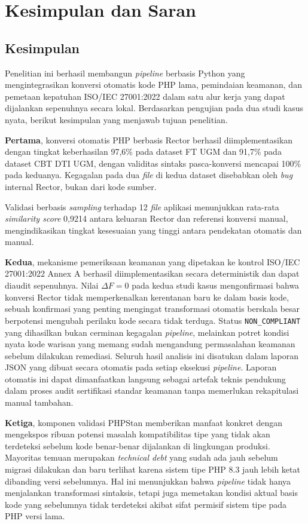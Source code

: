 \chapter{Kesimpulan dan Saran}

\section{Kesimpulan}

Penelitian ini berhasil membangun \textit{pipeline} berbasis Python 
yang mengintegrasikan konversi otomatis kode PHP lama, pemindaian 
keamanan, dan pemetaan kepatuhan ISO/IEC 27001:2022 dalam satu alur 
kerja yang dapat dijalankan sepenuhnya secara lokal. Berdasarkan 
pengujian pada dua studi kasus nyata, berikut kesimpulan yang 
menjawab tujuan penelitian.

\textbf{Pertama}, konversi otomatis PHP berbasis Rector berhasil 
diimplementasikan dengan tingkat keberhasilan 97,6\% pada dataset 
FT UGM dan 91,7\% pada dataset CBT DTI UGM, dengan validitas 
sintaks pasca-konversi mencapai 100\% pada keduanya. Kegagalan 
pada dua \textit{file} di kedua dataset disebabkan oleh 
\textit{bug} internal Rector, bukan dari kode sumber.

Validasi berbasis \textit{sampling} terhadap 12 \textit{file}
aplikasi menunjukkan rata-rata \textit{similarity score} 0,9214
antara keluaran Rector dan referensi konversi manual,
mengindikasikan tingkat kesesuaian yang tinggi antara
pendekatan otomatis dan manual.

\textbf{Kedua}, mekanisme pemeriksaan keamanan yang dipetakan ke
kontrol ISO/IEC 27001:2022 Annex A berhasil diimplementasikan secara
deterministik dan dapat diaudit sepenuhnya. Nilai $\Delta F = 0$ pada
kedua studi kasus mengonfirmasi bahwa konversi Rector tidak
memperkenalkan kerentanan baru ke dalam basis kode, sebuah konfirmasi
yang penting mengingat transformasi otomatis berskala besar berpotensi
mengubah perilaku kode secara tidak terduga. Status
\texttt{NON\_COMPLIANT} yang dihasilkan bukan cerminan kegagalan
\textit{pipeline}, melainkan potret kondisi nyata kode warisan yang
memang sudah mengandung permasalahan keamanan sebelum dilakukan
remediasi. Seluruh hasil analisis ini disatukan dalam laporan 
JSON yang dibuat secara otomatis pada setiap eksekusi \textit{pipeline}. 
Laporan otomatis ini dapat dimanfaatkan langsung sebagai artefak teknis pendukung dalam proses audit sertifikasi standar keamanan tanpa memerlukan rekapitulasi manual tambahan.

\textbf{Ketiga}, komponen validasi PHPStan memberikan manfaat konkret
dengan mengekspos ribuan potensi masalah kompatibilitas tipe yang
tidak akan terdeteksi sebelum kode benar-benar dijalankan di
lingkungan produksi. Mayoritas temuan merupakan \textit{technical
debt} yang sudah ada jauh sebelum migrasi dilakukan dan baru terlihat
karena sistem tipe PHP 8.3 jauh lebih ketat dibanding versi
sebelumnya. Hal ini menunjukkan bahwa \textit{pipeline} 
tidak hanya menjalankan transformasi sintaksis, tetapi juga 
memetakan kondisi aktual basis kode yang sebelumnya tidak 
terdeteksi akibat sifat permisif sistem tipe pada PHP versi lama.

